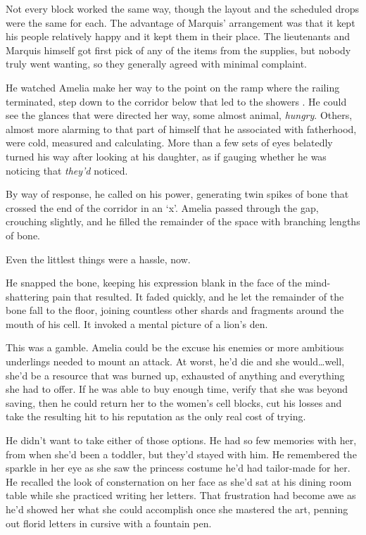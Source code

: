 Not every block worked the same way, though the layout and the scheduled drops were the same for each.  The advantage of Marquis' arrangement was that it kept his people relatively happy and it kept them in their place.  The lieutenants and Marquis himself got first pick of any of the items from the supplies, but nobody truly went wanting, so they generally agreed with minimal complaint.



He watched Amelia make her way to the point on the ramp where the railing terminated, step down to the corridor below that led to the showers .  He could see the glances that were directed her way, some almost animal, \emph{hungry}.  Others, almost more alarming to that part of himself that he associated with fatherhood, were cold, measured and calculating.  More than a few sets of eyes belatedly turned his way after looking at his daughter, as if gauging whether he was noticing that \emph{they'd} noticed.



By way of response, he called on his power, generating twin spikes of bone that crossed the end of the corridor in an `x'.  Amelia passed through the gap, crouching slightly, and he filled the remainder of the space with branching lengths of bone.



Even the littlest things were a hassle, now.



He snapped the bone, keeping his expression blank in the face of the mind-shattering pain that resulted.  It faded quickly, and he let the remainder of the bone fall to the floor, joining countless other shards and fragments around the mouth of his cell.  It invoked a mental picture of a lion's den.



This was a gamble.  Amelia could be the excuse his enemies or more ambitious underlings needed to mount an attack.  At worst, he'd die and she would\ldots well, she'd be a resource that was burned up, exhausted of anything and everything she had to offer.  If he was able to buy enough time, verify that she was beyond saving, then he could return her to the women's cell blocks, cut his losses and take the resulting hit to his reputation as the only real cost of trying.



He didn't want to take either of those options.  He had so few memories with her, from when she'd been a toddler, but they'd stayed with him.  He remembered the sparkle in her eye as she saw the princess costume he'd had tailor-made for her.  He recalled the look of consternation on her face as she'd sat at his dining room table while she practiced writing her letters.   That frustration had become awe as he'd showed her what she could accomplish once she mastered the art, penning out florid letters in cursive with a fountain pen.



